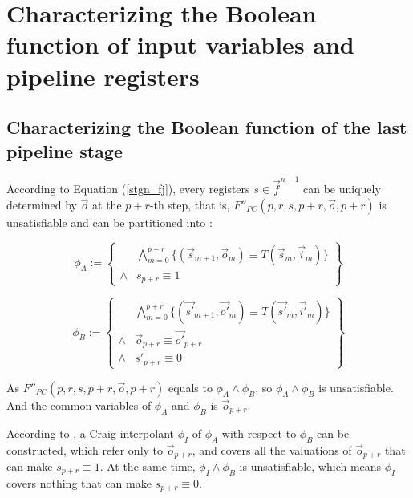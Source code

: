 \documentclass[runningheads,a4paper,orivec]{llncs}
\begin{document}

\section{Characterizing the Boolean function of input variables and pipeline registers}\label{sec_char}
\subsection{Characterizing the Boolean function of the last pipeline stage}

According to Equation (\ref{stgn_fj}),
every registers $s\in \vec{f}^{n-1}$ can be uniquely determined by $\vec{o}$ at the $p+r$-th step,
that is,
$F''_{PC}(p,r,s,p+r,\vec{o},p+r)$ is unsatisfiable and can be partitioned into :

\begin{equation}
 \phi_A := 
 \left\{
\begin{array}{cc}
&\bigwedge_{m=0}^{p+r}
\{
(\vec{s}_{m+1},\vec{o}_m)\equiv T(\vec{s}_m,\vec{i}_m)
\}
\\
\wedge& s_{p+r}\equiv 1 
\end{array}
\right\}
\end{equation}

\begin{equation}
\phi_B := 
\left\{
\begin{array}{cc}
&\bigwedge_{m=0}^{p+r}
\{
(\vec{s'}_{m+1},\vec{o'}_m)\equiv T(\vec{s'}_m,\vec{i'}_m)
\}
\\
\wedge&\vec{o}_{p+r}\equiv \vec{o'}_{p+r} \\
\wedge& s'_{p+r}\equiv 0 
\end{array}
\right\}
\end{equation}

As $F''_{PC}(p,r,s,p+r,\vec{o},p+r)$ equals to $\phi_A \wedge \phi_B$,
so $\phi_A \wedge \phi_B$ is unsatisfiable.
And the common variables of $\phi_A$ and $\phi_B$ is $\vec{o}_{p+r}$.

According to \cite{InterpBoolFunction},
a Craig interpolant $\phi_I$ of $\phi_A$ with respect to $\phi_B$ can be constructed,
which refer only to $\vec{o}_{p+r}$,
and covers all the valuations of $\vec{o}_{p+r}$ that can make $s_{p+r}\equiv 1$.
At the same time,
$\phi_I\wedge \phi_B$ is unsatisfiable,
which means $\phi_I$ covers nothing that can make $s_{p+r}\equiv 0$.
\end{document}

